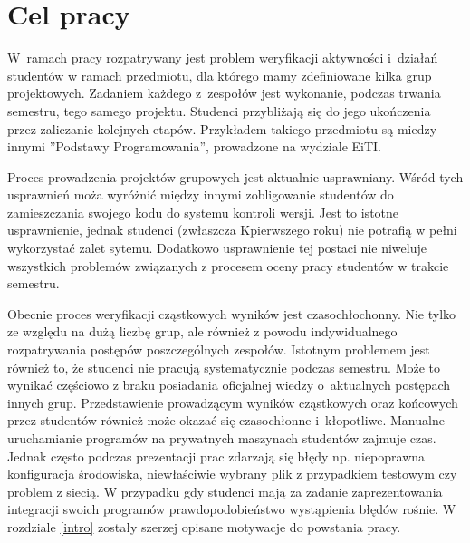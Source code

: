 \chapter{Cel pracy}

W~ramach pracy rozpatrywany jest problem weryfikacji aktywności i~działań studentów w ramach przedmiotu, dla którego mamy zdefiniowane kilka grup projektowych.
Zadaniem każdego z~zespołów jest wykonanie, podczas trwania semestru, tego samego projektu.
Studenci przybliżają się do jego ukończenia przez zaliczanie kolejnych etapów.
Przykładem takiego przedmiotu są miedzy innymi ”Podstawy Programowania”, prowadzone na wydziale EiTI.

Proces prowadzenia projektów grupowych jest aktualnie usprawniany.
Wśród tych usprawnień moża wyróżnić między innymi zobligowanie studentów do zamieszczania swojego kodu do systemu kontroli wersji.
Jest to istotne usprawnienie, jednak studenci (zwłaszcza Kpierwszego roku) nie potrafią w pełni wykorzystać zalet sytemu.
Dodatkowo usprawnienie tej postaci nie niweluje wszystkich problemów związanych z procesem oceny pracy studentów w trakcie semestru.

Obecnie proces weryfikacji cząstkowych wyników jest czasochłochonny.
Nie tylko ze względu na dużą liczbę grup, ale również z powodu indywidualnego rozpatrywania postępów poszczególnych zespołów.
Istotnym problemem jest również to, że studenci nie pracują systematycznie podczas semestru.
Może to wynikać częściowo z braku posiadania oficjalnej wiedzy o~aktualnych postępach innych grup.
Przedstawienie prowadzącym wyników cząstkowych oraz końcowych przez studentów również może okazać się czasochłonne i~kłopotliwe.
Manualne uruchamianie programów na prywatnych maszynach studentów zajmuje czas.
Jednak często podczas prezentacji prac zdarzają się błędy np. niepoprawna konfiguracja środowiska, niewłaściwie wybrany plik z przypadkiem testowym czy problem z siecią.
W przypadku gdy studenci mają za zadanie zaprezentowania integracji swoich programów prawdopodobieństwo wystąpienia błędów rośnie.
W rozdziale \ref{intro} zostały szerzej opisane motywacje do powstania pracy.

